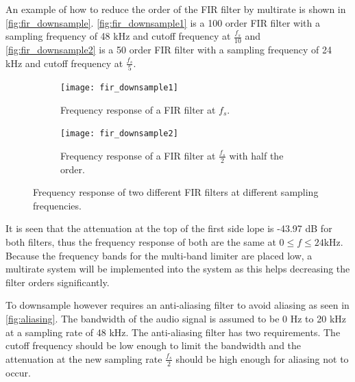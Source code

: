 An example of how to reduce the order of the FIR filter by multirate is shown in \autoref{fig:fir_downsample}. \autoref{fig:fir_downsample1} is a 100 order FIR filter with a sampling frequency of 48 kHz and cutoff frequency at $\frac{f_s}{10}$ and \autoref{fig:fir_downsample2} is a 50 order FIR filter with a sampling frequency of 24 kHz and cutoff frequency at $\frac{f_s}{5}$. 

\begin{figure}[H]
\centering
\begin{subfigure}[t]{0.44\textwidth}
\texttt{[image: fir\_downsample1]}
	\caption{Frequency response of a FIR filter at $f_s$.}
	\label{fig:fir_downsample1}
\end{subfigure}
\hspace{6mm} 
\begin{subfigure}[t]{0.47\textwidth}
\texttt{[image: fir\_downsample2]}
	\caption{Frequency response of a FIR filter at $\frac{f_s}{2}$ with half the order.}
	\label{fig:fir_downsample2}
\end{subfigure}
\caption{Frequency response of two different FIR filters at different sampling frequencies.}
\label{fig:fir_downsample}
\end{figure}

It is seen that the attenuation at the top of the first side lope is -43.97 dB for both filters, thus the frequency response of both are the same at $0 \leq f \leq 24 \text{kHz}$. Because the frequency bands for the multi-band limiter are placed low, a multirate system will be implemented into the system as this helps decreasing the filter orders significantly.

To downsample however requires an anti-aliasing filter to avoid aliasing as seen in \autoref{fig:aliasing}. The bandwidth of the audio signal is assumed to be 0 Hz to 20 kHz at a sampling rate of 48 kHz. The anti-aliasing filter has two requirements. The cutoff frequency should be low enough to limit the bandwidth and the attenuation at the new sampling rate $\frac{f_s}{2}$ should be high enough for aliasing not to occur. 

